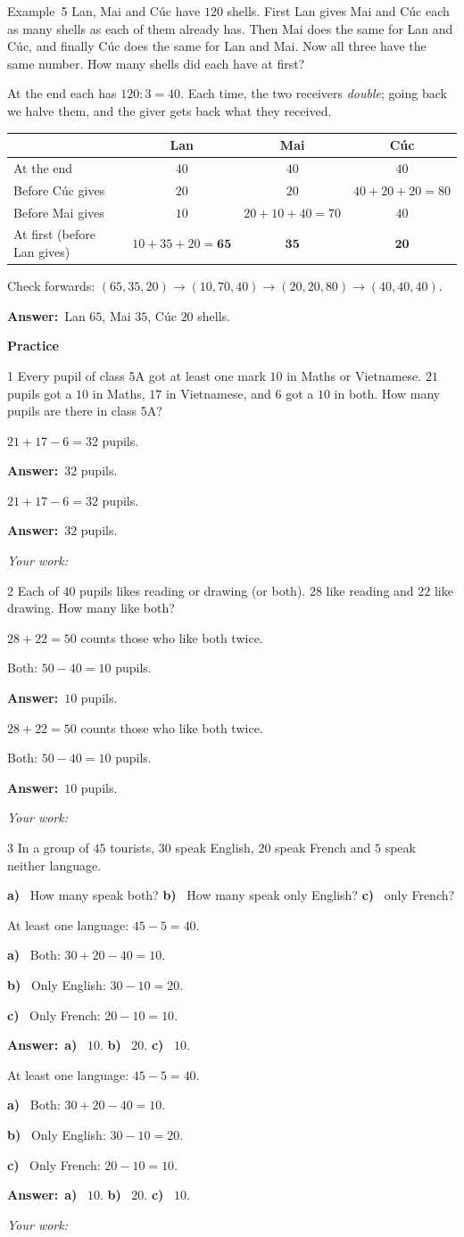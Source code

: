 \documentclass[11pt]{article}
\newif\ifsol \soltrue
\renewcommand{\arraystretch}{1.35}
\providecommand{\AnsWord}{Đáp số}
\newcommand{\dapso}[1]{\par\textbf{\AnsWord:}\ #1}
\newcommand{\guide}{\par\vspace{4pt}{\bfseries\color{tmBlue}\GuideWord}\par\vspace{3pt}\nopagebreak}
\newcommand{\probsol}[1]{%
  \begin{lrbox}{\solmeasure}\begin{minipage}{\dimexpr\linewidth-24pt\relax}#1\end{minipage}\end{lrbox}%
  \ifsol
    \begin{solbox}#1\end{solbox}%
  \else
    \setlength{\solht}{\dimexpr\ht\solmeasure+\dp\solmeasure+0.85cm\relax}%
    \ifdim\solht<1.35cm\setlength{\solht}{1.35cm}\fi
    \begin{tcolorbox}[colback=white,colframe=Line,boxrule=0.8pt,arc=5pt,
      left=8pt,right=8pt,top=4pt,bottom=4pt,height=\solht]{\footnotesize\color{Slate}\itshape\WorkWord}\end{tcolorbox}%
  \fi}
\newcommand{\dividerbar}[1]{\par\vspace{0.6em}\noindent
  \begin{tcolorbox}[enhanced,frame hidden,interior hidden,borderline west={5pt}{0pt}{ProbBlue},
    colback=white,left=12pt,right=12pt,top=5pt,bottom=5pt,arc=4pt]
  {\large\bfseries\color{ProbBlue} #1}\end{tcolorbox}\vspace{0.4em}}
\newcommand{\pa}[1]{\textbf{#1)}\ }
\newcommand{\gap}{\vspace{0.3cm}}
\def\GuideWord{Guided solution.}
\def\WorkWord{Your work:}
\def\AnsWord{Answer}
\def\ExWord{Example}
\begin{document}
\gap
\begin{exbox}{\ExWord\ 5}
Lan, Mai and Cúc have $120$ shells. First Lan gives Mai and Cúc each as many shells as each of them already has. Then Mai does the same for Lan and Cúc, and finally Cúc does the same for Lan and Mai. Now all three have the same number. How many shells did each have at first?
\guide
At the end each has $120:3=40$. Each time, the two receivers \emph{double}; going back we halve them, and the giver gets back what they received.
\begin{center}
\renewcommand{\arraystretch}{1.25}
\begin{tabular}{|l|c|c|c|}
\hline
 & Lan & Mai & Cúc\\\hline
At the end & $40$ & $40$ & $40$\\\hline
Before Cúc gives & $20$ & $20$ & $40+20+20=80$\\\hline
Before Mai gives & $10$ & $20+10+40=70$ & $40$\\\hline
At first (before Lan gives) & $10+35+20=\mathbf{65}$ & $\mathbf{35}$ & $\mathbf{20}$\\\hline
\end{tabular}
\end{center}
Check forwards: $(65,35,20)\to(10,70,40)\to(20,20,80)\to(40,40,40)$.
\dapso{Lan $65$, Mai $35$, Cúc $20$ shells.}
\end{exbox}
\dividerbar{Practice}
\begin{probbox}{1}{\relax}
Every pupil of class 5A got at least one mark $10$ in Maths or Vietnamese. $21$ pupils got a $10$ in Maths, $17$ in Vietnamese, and $6$ got a $10$ in both. How many pupils are there in class 5A?
\end{probbox}
\probsol{
$21+17-6=32$ pupils.
\dapso{$32$ pupils.}}
\gap
\begin{probbox}{2}{\relax}
Each of $40$ pupils likes reading or drawing (or both). $28$ like reading and $22$ like drawing. How many like both?
\end{probbox}
\probsol{
$28+22=50$ counts those who like both twice.\par Both: $50-40=10$ pupils.
\dapso{$10$ pupils.}}
\gap
\begin{probbox}{3}{\relax}
In a group of $45$ tourists, $30$ speak English, $20$ speak French and $5$ speak neither language.\par
\pa{a} How many speak both? \quad \pa{b} How many speak only English? \quad \pa{c} only French?
\end{probbox}
\probsol{
At least one language: $45-5=40$.\par
\pa{a} Both: $30+20-40=10$.\par
\pa{b} Only English: $30-10=20$.\par
\pa{c} Only French: $20-10=10$.
\dapso{\pa{a} $10$. \pa{b} $20$. \pa{c} $10$.}}
\end{document}
